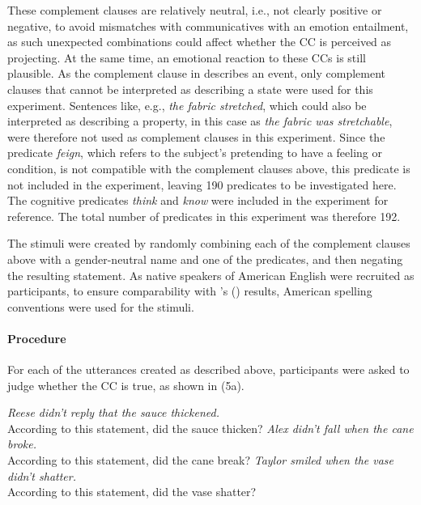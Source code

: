 \documentclass[11pt,fleqn]{article}
\newcommand{\6}{\mbox{$[\hspace*{-.6mm}[$}}
\newcommand{\9}{\mbox{$]\hspace*{-.6mm}]$}}
\newcommand{\citepos}[1]{\citeauthor{#1}'s (\citeyear{#1})}
\begin{document}
These complement clauses are relatively neutral, i.e., not clearly positive or negative, to avoid mismatches with communicatives with an emotion entailment, as such unexpected combinations could affect whether the CC is perceived as projecting. At the same time, an emotional reaction to these CCs is still plausible. As the complement clause in \cite{white-rawlins-nels2018} describes an event, only complement clauses that cannot be interpreted as describing a state were used for this experiment. Sentences like, e.g., \emph{the fabric stretched}, which could also be interpreted as describing a property, in this case as \emph{the fabric was stretchable}, were therefore not used as complement clauses in this experiment. Since the predicate \emph{feign}, which refers to the subject's pretending to have a feeling or condition, is not compatible with the complement clauses above, this predicate is not included in the experiment, leaving 190 predicates to be investigated here. The cognitive predicates \emph{think} and \emph{know} were included in the experiment for reference. The total number of predicates in this experiment was therefore 192. 

The stimuli were created by randomly combining each of the complement clauses above with a gender-neutral name and one of the predicates, and then negating the resulting statement. As native speakers of American English were recruited as participants, to ensure comparability with \citepos{white-rawlins-nels2018} results, American spelling conventions were used for the stimuli.

\paragraph{Procedure}

For each of the utterances created as described above, participants were asked to judge whether the CC is true, as shown in (5a). 

\begin{exe}
	\ex
	\begin{xlist}
		\ex \emph{Reese didn't reply that the sauce thickened.} \\
		According to this statement, did the sauce thicken?
		\ex \emph{Alex didn't fall when the cane broke.} \\
		According to this statement, did the cane break?
		\ex \emph{Taylor smiled when the vase didn't shatter.} \\
		According to this statement, did the vase shatter?
	\end{xlist}
\end{exe}
\end{document}

